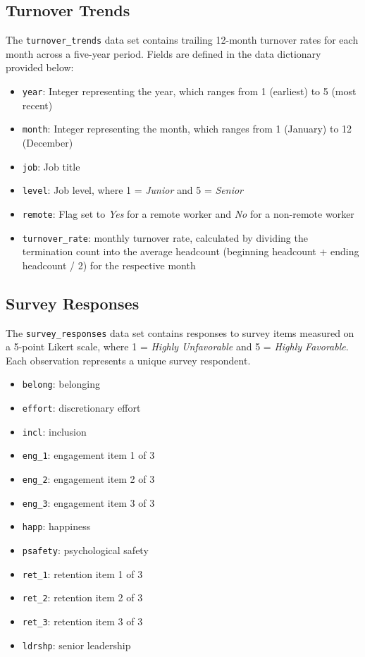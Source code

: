 \documentclass[
]{book}
\providecommand{\tightlist}{%
  \setlength{\itemsep}{0pt}\setlength{\parskip}{0pt}}
\begin{document}
\hypertarget{turnover-trends}{%
\subsection{Turnover Trends}\label{turnover-trends}}

The \texttt{turnover\_trends} data set contains trailing 12-month turnover rates for each month across a five-year period. Fields are defined in the data dictionary provided below:

\begin{itemize}
\tightlist
\item
  \texttt{year}: Integer representing the year, which ranges from 1 (earliest) to 5 (most recent)
\item
  \texttt{month}: Integer representing the month, which ranges from 1 (January) to 12 (December)
\item
  \texttt{job}: Job title
\item
  \texttt{level}: Job level, where 1 = \emph{Junior} and 5 = \emph{Senior}
\item
  \texttt{remote}: Flag set to \emph{Yes} for a remote worker and \emph{No} for a non-remote worker
\item
  \texttt{turnover\_rate}: monthly turnover rate, calculated by dividing the termination count into the average headcount (beginning headcount + ending headcount / 2) for the respective month
\end{itemize}

\hypertarget{survey-responses}{%
\subsection{Survey Responses}\label{survey-responses}}

The \texttt{survey\_responses} data set contains responses to survey items measured on a 5-point Likert scale, where 1 = \emph{Highly Unfavorable} and 5 = \emph{Highly Favorable}. Each observation represents a unique survey respondent.

\begin{itemize}
\tightlist
\item
  \texttt{belong}: belonging
\item
  \texttt{effort}: discretionary effort
\item
  \texttt{incl}: inclusion
\item
  \texttt{eng\_1}: engagement item 1 of 3
\item
  \texttt{eng\_2}: engagement item 2 of 3
\item
  \texttt{eng\_3}: engagement item 3 of 3
\item
  \texttt{happ}: happiness
\item
  \texttt{psafety}: psychological safety
\item
  \texttt{ret\_1}: retention item 1 of 3
\item
  \texttt{ret\_2}: retention item 2 of 3
\item
  \texttt{ret\_3}: retention item 3 of 3
\item
  \texttt{ldrshp}: senior leadership
\end{itemize}
\end{document}
